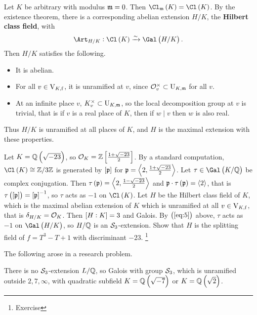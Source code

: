 Let $ K $ be arbitrary with modulus $ \mathfrak{m} = 0 $. Then $ \Cl_\mmm\br{K} = \Cl\br{K} $. By the existence theorem, there is a corresponding abelian extension $ H / K $, the \textbf{Hilbert class field}, with
$$ \Art_{H / K} : \Cl\br{K} \xrightarrow{\sim} \Gal\br{H / K}. $$
Then $ H / K $ satisfies the following.
\begin{itemize}
\item It is abelian.
\item For all $ v \in \mathrm{V}_{K, \mathrm{f}} $, it is unramified at $ v $, since $ \mathcal{O}_v^\times \subset \mathrm{U}_{K, \mathfrak{m}} $ for all $ v $.
\item At an infinite place $ v $, $ K_v^\times \subset \mathrm{U}_{K, \mathfrak{m}} $, so the local decomposition group at $ v $ is trivial, that is if $ v $ is a real place of $ K $, then if $ w \mid v $ then $ w $ is also real.
\end{itemize}
Thus $ H / K $ is unramified at all places of $ K $, and $ H $ is the maximal extension with these properties.

\begin{example*}
Let $ K = \QQ\br{\sqrt{-23}} $, so $ \OOO_K = \ZZ\sbr{\tfrac{1 + \sqrt{-23}}{2}} $. By a standard computation, $ \Cl\br{K} \cong \ZZ / 3\ZZ $ is generated by $ \sbr{\ppp} $ for $ \mathfrak{p} = \left\langle 2, \tfrac{1 + \sqrt{-23}}{2} \right\rangle $. Let $ \tau \in \Gal\br{K / \QQ} $ be complex conjugation. Then $ \tau\br{\ppp} = \abr{2, \tfrac{1 - \sqrt{-23}}{2}} $ and $ \ppp \cdot \tau\br{\ppp} = \abr{2} $, that is $ \tau\br{\sbr{\ppp}} = \sbr{\ppp}^{-1} $, so $ \tau $ acts as $ -1 $ on $ \Cl\br{K} $. Let $ H $ be the Hilbert class field of $ K $, which is the maximal abelian extension of $ K $ which is unramified at all $ v \in \mathrm{V}_{K, \mathrm{f}} $, that is $ \delta_{H / K} = \mathcal{O}_K $. Then $ \sbr{H : K} = 3 $ and Galois. By $ \br{\ref{eq:5}} $ above, $ \tau $ acts as $ -1 $ on $ \Gal\br{H / K} $, so $ H / \mathbb{Q} $ is an $ \mathcal{S}_3 $-extension. Show that $ H $ is the splitting field of $ f = T^3 - T + 1 $ with discriminant $ -23 $. \footnote{Exercise}
\end{example*}

\pagebreak


The following arose in a research problem.

\begin{proposition}
There is no $ \mathcal{S}_3 $-extension $ L / \mathbb{Q} $, so Galois with group $ \mathcal{S}_3 $, which is unramified outside $ 2, 7, \infty $, with quadratic subfield $ K = \QQ\br{\sqrt{-7}} $ or $ K = \QQ\br{\sqrt{2}} $.
\end{proposition}

